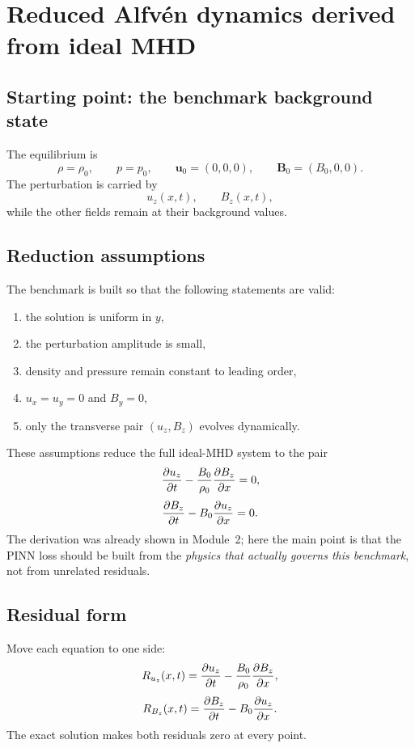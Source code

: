 \documentclass[11pt]{article}
\newcommand{\uvec}{\mathbf{u}}
\newcommand{\Bvec}{\mathbf{B}}
\begin{document}
\section{Reduced Alfv\'en dynamics derived from ideal MHD}

\subsection{Starting point: the benchmark background state}
The equilibrium is
\begin{equation}
\rho=\rho_0,\qquad
p=p_0,\qquad
\uvec_0=(0,0,0),\qquad
\Bvec_0=(B_0,0,0).
\label{eq:m3-bg}
\end{equation}
The perturbation is carried by
\begin{equation}
u_z(x,t),\qquad B_z(x,t),
\end{equation}
while the other fields remain at their background values.

\subsection{Reduction assumptions}
The benchmark is built so that the following statements are valid:
\begin{enumerate}[leftmargin=1.8em]
    \item the solution is uniform in $y$,
    \item the perturbation amplitude is small,
    \item density and pressure remain constant to leading order,
    \item $u_x=u_y=0$ and $B_y=0$,
    \item only the transverse pair $(u_z,B_z)$ evolves dynamically.
\end{enumerate}
These assumptions reduce the full ideal-MHD system to the pair
\begin{equation}
\pdv{u_z}{t} - \frac{B_0}{\rho_0}\pdv{B_z}{x}=0,
\label{eq:m3-red1}
\end{equation}
\begin{equation}
\pdv{B_z}{t} - B_0\pdv{u_z}{x}=0.
\label{eq:m3-red2}
\end{equation}
The derivation was already shown in Module~2; here the main point is that the PINN loss should be built from the \emph{physics that actually governs this benchmark}, not from unrelated residuals.

\subsection{Residual form}
Move each equation to one side:
\begin{equation}
R_{u_z}(x,t)
=
\pdv{u_z}{t}
-
\frac{B_0}{\rho_0}\pdv{B_z}{x},
\label{eq:m3-ruz}
\end{equation}
\begin{equation}
R_{B_z}(x,t)
=
\pdv{B_z}{t}
-
B_0\pdv{u_z}{x}.
\label{eq:m3-rbz}
\end{equation}
The exact solution makes both residuals zero at every point.
\end{document}
